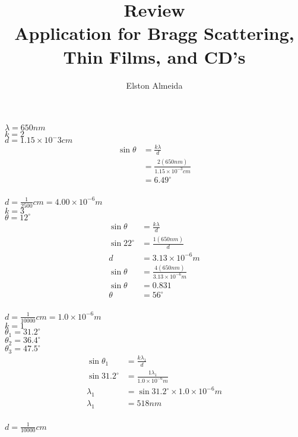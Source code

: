 \documentclass[12pt]{article}
\begin{document}
\title{\textbf{Review}\\ Application for Bragg Scattering, Thin Films, and CD's}
\author{Elston Almeida}

\maketitle
\vspace{2pc}

\noindent
$\lambda = 650nm$\\
$k = 2$ \\
$d = 1.15{\times}10^-3cm$\\

\begin{equation}
  \begin{split}
  \sin \theta & = \frac{k \lambda}{d} \\
  & = \frac{2(650nm)}{1.15{\times}10^{-3}cm } \\
  & = 6.49 ^\circ \\ 
  \end{split}
\end{equation}

\noindent
$d = \frac{1}{2500}cm = 4.00 \times 10^{-6}m$ \\ 
$k = 3$ \\ 
$\theta = 12^\circ$ \\

\begin{equation}
  \begin{split}
    \sin \theta & = \frac{k \lambda}{d} \\
    \sin 22^\circ & = \frac{1(650nm)}{d} \\
    d & = 3.13{\times}10^{-6}m \\
    \sin \theta & = \frac{4(650nm)}{3.13{\times}10^{-6}m } \\
    \sin \theta & = 0.831 \\
    \theta & = 56^\circ \\
  \end{split}
\end{equation}

\newpage

\noindent
$d = \frac{1}{10000}cm = 1.0{\times}10^{-6}m$\\
$k=1$\\
$\theta_1 = 31.2^\circ$\\
$\theta_2 = 36.4^\circ$\\
$\theta_3 = 47.5^\circ$\\

\begin{equation}
  \begin{split}
    \sin \theta_1 & = \frac{k \lambda_1}{d} \\
    \sin 31.2^\circ & = \frac{1 \lambda_1}{1.0{\times}10^{-6}m} \\
    \lambda_1 & = \sin 31.2^\circ{\times}1.0{\times}10^{-6}m \\
    \lambda_1 & = 518nm \\
  \end{split}
\end{equation}

\noindent
$d=\frac{1}{10000}cm$
\end{document}
